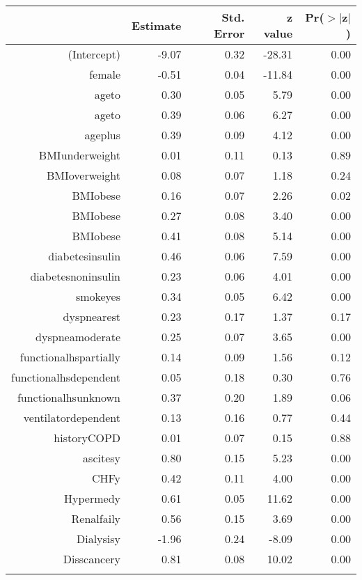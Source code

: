 \bigskip\bigskip
\centering
\begin{tabular}{rrrrr}
  \hline
 & Estimate & Std. Error & z value & Pr($>$$|$z$|$) \\ 
  \hline
(Intercept) & -9.07 & 0.32 & -28.31 & 0.00 \\ 
  female & -0.51 & 0.04 & -11.84 & 0.00 \\ 
  age\-65\-to\-74 & 0.30 & 0.05 & 5.79 & 0.00 \\ 
  age\-75\-to\-84 & 0.39 & 0.06 & 6.27 & 0.00 \\ 
  age\-85\-plus & 0.39 & 0.09 & 4.12 & 0.00 \\ 
  BMI\-underweight & 0.01 & 0.11 & 0.13 & 0.89 \\ 
  BMI\-overweight & 0.08 & 0.07 & 1.18 & 0.24 \\ 
  BMI\-obese\-1 & 0.16 & 0.07 & 2.26 & 0.02 \\ 
  BMI\-obese\-2 & 0.27 & 0.08 & 3.40 & 0.00 \\ 
  BMI\-obese\-3 & 0.41 & 0.08 & 5.14 & 0.00 \\ 
  diabetes\-insulin & 0.46 & 0.06 & 7.59 & 0.00 \\ 
  diabetes\-noninsulin & 0.23 & 0.06 & 4.01 & 0.00 \\ 
  smoke\-yes & 0.34 & 0.05 & 6.42 & 0.00 \\ 
  dyspnea\-rest & 0.23 & 0.17 & 1.37 & 0.17 \\ 
  dyspnea\-moderate & 0.25 & 0.07 & 3.65 & 0.00 \\ 
  functional\-hs\-partially & 0.14 & 0.09 & 1.56 & 0.12 \\ 
  functional\-hs\-dependent & 0.05 & 0.18 & 0.30 & 0.76 \\ 
  functional\-hs\-unknown & 0.37 & 0.20 & 1.89 & 0.06 \\ 
  ventilator\-dependent & 0.13 & 0.16 & 0.77 & 0.44 \\ 
  history\-COPD & 0.01 & 0.07 & 0.15 & 0.88 \\ 
  ascites\-y & 0.80 & 0.15 & 5.23 & 0.00 \\ 
  CHF\-y & 0.42 & 0.11 & 4.00 & 0.00 \\ 
  Hyper\-med\-y & 0.61 & 0.05 & 11.62 & 0.00 \\ 
  Renal\-fail\-y & 0.56 & 0.15 & 3.69 & 0.00 \\ 
  Dialysis\-y & -1.96 & 0.24 & -8.09 & 0.00 \\ 
  Diss\-cancer\-y & 0.81 & 0.08 & 10.02 & 0.00 \\ 
$$
\end{tabular}
